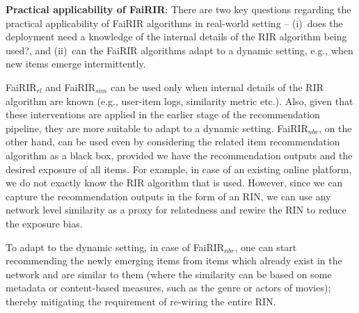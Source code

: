 \vspace{1 mm}
\noindent
\textbf{Practical applicability of FaiRIR}:
There are two key questions regarding the practical applicability of FaiRIR algorithms in real-world setting -- 
(i)~does the deployment need a knowledge of the internal details of the RIR algorithm being used?, and
(ii)~can the FaiRIR algorithms adapt to a dynamic setting, e.g., when new items emerge intermittently.



FaiRIR$_{rl}$ and FaiRIR$_{sim}$ can be used only when internal details of the RIR algorithm are known %
(e.g., user-item logs, similarity metric etc.). Also, given that these interventions are applied in the earlier stage of the recommendation pipeline, they are more suitable to adapt to a dynamic setting.
FaiRIR$_{nbr}$, on the other hand, can be used even by considering the related item recommendation
algorithm as a black box, provided we have the recommendation outputs and the desired exposure of all items. 
For example, in case of an existing online platform, we do not exactly know the %
RIR algorithm that is used. However, since we can capture the recommendation outputs in the form of an RIN, we can use any network level similarity as a proxy for relatedness and rewire the RIN to reduce the exposure bias.


To adapt to the dynamic setting, in case of FaiRIR$_{nbr}$, one can start recommending the newly emerging items from items which already exist in the network and are similar to them (where the similarity can be 
based on some metadata or content-based measures, such as the genre or actors of movies); thereby mitigating the requirement of re-wiring the entire RIN. 

